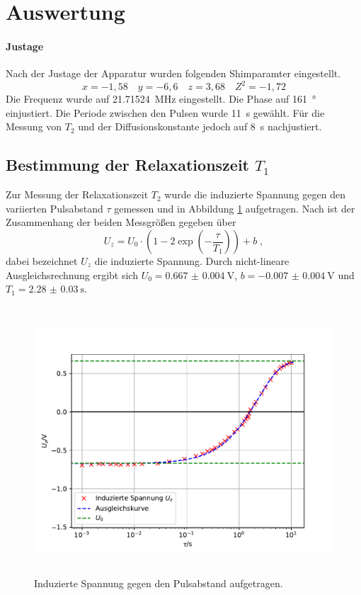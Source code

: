 \section{Auswertung}
\label{sec:Auswertung}
\paragraph{Justage} 
Nach der Justage der Apparatur wurden folgenden Shimparamter eingestellt.
\begin{equation*}
x = -1,58 \quad y = -6,6 \quad z = 3,68 \quad Z^2 = -1,72	
\end{equation*}
Die Frequenz wurde auf \SI{21,71524}{\mega\Hz} eingestellt. Die Phase auf 
\SI{161}{\degree} einjustiert. Die Periode zwischen den Pulsen wurde 
\SI{11}{\second} gewählt. Für die Messung von $T_2$ und der Diffusionskonstante 
jedoch auf \SI{8}{\second} nachjustiert.

\subsection{Bestimmung der Relaxationszeit \texorpdfstring{$T_1$}{math}}
Zur Messung der Relaxationszeit $T_2$ wurde die induzierte Spannung gegen den variierten 
Pulsabstand $\tau$ gemessen und in Abbildung \ref{fig:T1} aufgetragen. Nach \cite{Anleitung} 
ist der Zusammenhang der beiden Messgrößen gegeben über 
\begin{equation}
U_z = U_0 \cdot \left( 1-2\exp \left( -\frac{\tau}{T_1} \right) \right) + b	\; ,
\end{equation}
dabei bezeichnet $U_z$ die induzierte Spannung. Durch nicht-lineare Ausgleichsrechnung 
ergibt sich $U_0 = \SI{0.667(4)}{\volt}$, $b = \SI{-0.007(4)}{\volt}$ und $T_1 = \SI{2.28(3)}{\second}$. 
\begin{figure}
  \centering
  \includegraphics[height = 10cm]{plots/T1plot.pdf}
  \caption{Induzierte Spannung gegen den Pulsabstand aufgetragen.}
  \label{fig:T1}
\end{figure}
\FloatBarrier

